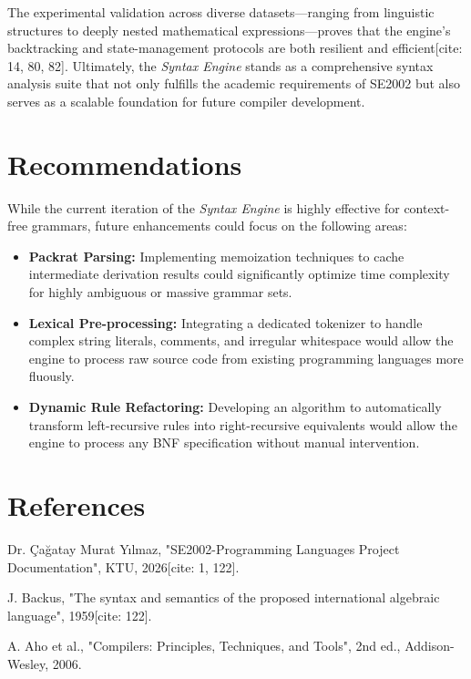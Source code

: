 \documentclass[12pt,a4paper]{article}
\begin{document}
    The experimental validation across diverse datasets—ranging from linguistic structures to deeply nested mathematical expressions—proves that the engine's backtracking and state-management protocols are both resilient and efficient[cite: 14, 80, 82]. Ultimately, the \textit{Syntax Engine} stands as a comprehensive syntax analysis suite that not only fulfills the academic requirements of SE2002 but also serves as a scalable foundation for future compiler development.

    \section{Recommendations}
    While the current iteration of the \textit{Syntax Engine} is highly effective for context-free grammars, future enhancements could focus on the following areas:
    \begin{itemize}
        \item \textbf{Packrat Parsing:} Implementing memoization techniques to cache intermediate derivation results could significantly optimize time complexity for highly ambiguous or massive grammar sets.
        \item \textbf{Lexical Pre-processing:} Integrating a dedicated tokenizer to handle complex string literals, comments, and irregular whitespace would allow the engine to process raw source code from existing programming languages more fluously.
        \item \textbf{Dynamic Rule Refactoring:} Developing an algorithm to automatically transform left-recursive rules into right-recursive equivalents would allow the engine to process any BNF specification without manual intervention.
    \end{itemize}
    
    \section*{References}
    \begin{enumerate}[label={[\arabic*]}]
        \item Dr. Çağatay Murat Yılmaz, "SE2002-Programming Languages Project Documentation", KTU, 2026[cite: 1, 122].
        \item J. Backus, "The syntax and semantics of the proposed international algebraic language", 1959[cite: 122].
        \item A. Aho et al., "Compilers: Principles, Techniques, and Tools", 2nd ed., Addison-Wesley, 2006.
    \end{enumerate}
    
\end{document}
